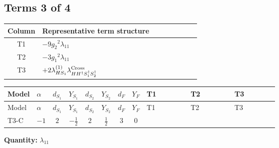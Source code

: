 \documentclass[8pt]{article}
\begin{document}
\begin{landscape}
\subsection*{Terms 3 of 4}
\begin{center}
\begin{tabular}{@{}c >{\raggedright\arraybackslash}p{0.82\linewidth}@{}}
\toprule
Column & Representative term structure \\
\midrule
T1 & \(\displaystyle -9 {g_2}^2 {\lambda_{11}}\) \\
\midrule
T2 & \(\displaystyle -3 {g_1}^2 {\lambda_{11}}\) \\
\midrule
T3 & \(\displaystyle +2 {\lambda_{HS_1}^{(1)}} {\lambda_{H H^\dagger S_1^\dagger S_2^\dagger}^{\rm Cross}}\) \\
\midrule
\bottomrule
\end{tabular}
\end{center}
\smallskip
\tiny
\begin{longtable}{@{}llcccccc >{\raggedright\arraybackslash}p{0.21\linewidth} >{\raggedright\arraybackslash}p{0.21\linewidth} >{\raggedright\arraybackslash}p{0.21\linewidth}@{}}
\toprule
Model & $\alpha$ & $d_{S_1}$ & $Y_{S_1}$ & $d_{S_2}$ & $Y_{S_2}$ & $d_F$ & $Y_F$ & T1 & T2 & T3 \\
\midrule
\endfirsthead
\toprule
Model & $\alpha$ & $d_{S_1}$ & $Y_{S_1}$ & $d_{S_2}$ & $Y_{S_2}$ & $d_F$ & $Y_F$ & T1 & T2 & T3 \\
\midrule
\endhead
T3-C & $-1$ & $2$ & $-\frac{1}{2}$ & $2$ & $\frac{1}{2}$ & $3$ & $0$ & \scriptsize\adjustbox{max width=\linewidth}{$\begin{gathered} -9 {g_2}^2 {\lambda_{11}}\end{gathered}$} & \scriptsize\adjustbox{max width=\linewidth}{$\begin{gathered} -3 {g_1}^2 {\lambda_{11}}\end{gathered}$} & \scriptsize\adjustbox{max width=\linewidth}{$\begin{gathered} +2 {\lambda_{HS_1}^{(1)}} {\lambda_{H H^\dagger S_1^\dagger S_2^\dagger}^{\rm Cross}}\end{gathered}$} \\
\midrule
\bottomrule
\end{longtable}
\clearpage
\noindent\textbf{Quantity: }$\lambda_{11}$\par\smallskip

\end{landscape}
\end{document}
